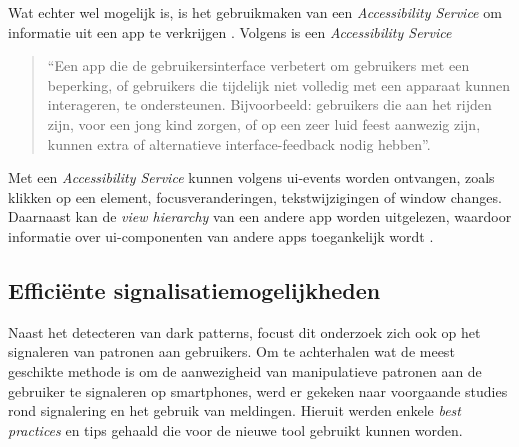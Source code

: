 \vspace{1em}

Wat echter wel mogelijk is, is het gebruikmaken van een \textit{Accessibility Service} om informatie uit een app te verkrijgen \autocite{AndroidAccessibility2026}. Volgens \textcite{AndroidAccessibility2026} is een \textit{Accessibility Service}

\begin{quote}
    “Een app die de gebruikersinterface verbetert om gebruikers met een beperking, of gebruikers die tijdelijk niet volledig met een apparaat kunnen interageren, te ondersteunen. Bijvoorbeeld: gebruikers die aan het rijden zijn, voor een jong kind zorgen, of op een zeer luid feest aanwezig zijn, kunnen extra of alternatieve interface-feedback nodig hebben”.
\end{quote}

Met een \textit{Accessibility Service} kunnen volgens \textcite{AndroidAccessibility2026} \acrshort{ui}-events worden ontvangen, zoals klikken op een element, focusveranderingen, tekstwijzigingen of window changes. Daarnaast kan de \textit{view hierarchy} van een andere app worden uitgelezen, waardoor informatie over \acrshort{ui}-componenten van andere apps toegankelijk wordt \autocite{AndroidAccessibility2026}.

\vspace{1em}

\subsection{Efficiënte signalisatiemogelijkheden}
\label{subsec:ontwerpprincipes}

\vspace{1em}

Naast het detecteren van dark patterns, focust dit onderzoek zich ook op het signaleren van patronen aan gebruikers. Om te achterhalen wat de meest geschikte methode is om de aanwezigheid van manipulatieve patronen aan de gebruiker te signaleren op smartphones, werd er gekeken naar voorgaande studies rond signalering en het gebruik van meldingen. Hieruit werden enkele \textit{best practices} en tips gehaald die voor de nieuwe tool gebruikt kunnen worden.

\vspace{1em}

